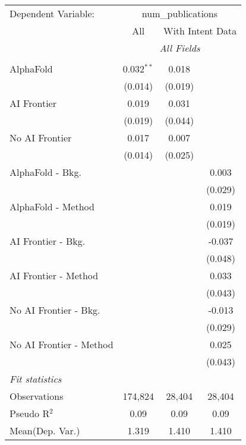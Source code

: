 \begingroup
\centering
\begin{tabular}{lccc}
   \tabularnewline \midrule \midrule
   Dependent Variable: & \multicolumn{3}{c}{num\_publications}\\
 & \multicolumn{1}{c}{All} & \multicolumn{2}{c}{With Intent Data} \\
\cmidrule(lr){2-2} \cmidrule(lr){3-4}
 & \multicolumn{3}{c}{\textit{All Fields}} \\ \\
   AlphaFold               & 0.032$^{**}$ & 0.018   &   \\   
                           & (0.014)      & (0.019) &   \\   
   AI Frontier             & 0.019        & 0.031   &   \\   
                           & (0.019)      & (0.044) &   \\   
   No AI Frontier          & 0.017        & 0.007   &   \\   
                           & (0.014)      & (0.025) &   \\   
   AlphaFold - Bkg.        &              &         & 0.003\\   
                           &              &         & (0.029)\\   
   AlphaFold - Method      &              &         & 0.019\\   
                           &              &         & (0.019)\\   
   AI Frontier - Bkg.      &              &         & -0.037\\   
                           &              &         & (0.048)\\   
   AI Frontier - Method    &              &         & 0.033\\   
                           &              &         & (0.043)\\   
   No AI Frontier - Bkg.   &              &         & -0.013\\   
                           &              &         & (0.029)\\   
   No AI Frontier - Method &              &         & 0.025\\   
                           &              &         & (0.043)\\   
   \midrule
   \emph{Fit statistics}\\
   Observations            & 174,824      & 28,404  & 28,404\\  
   Pseudo R$^2$            & 0.09         & 0.09    & 0.09\\  
Mean(Dep. Var.) & 1.319 & 1.410 & 1.410 \\
   

\end{tabular}
